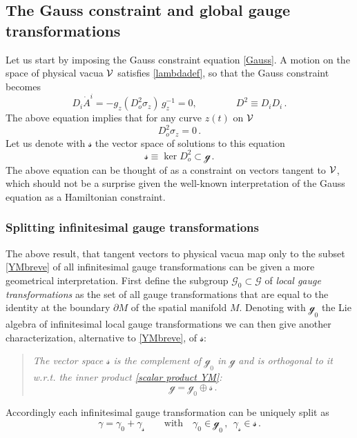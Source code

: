 \documentclass[11pt,a4paper]{article}
\def\calg{{\mathscr G}}
\def\calsg{{\boldsymbol{\mathscr g}}}
\def\calss{{\boldsymbol{\mathscr s}}}
\def\calv{{\cal V}}
\begin{document}
    \subsection{The Gauss constraint and global gauge transformations}\label{gaussglobal}
    
    Let us start by imposing the Gauss constraint equation \eqref{Gauss}. A motion on the space of physical vacua $\calv$ satisfies \eqref{lambdadef}, so that the Gauss constraint becomes 
    \begin{equation}
    D_i\dot{A}^i=-g_z (D^2_o\sigma_z)\,g_z^{-1}=0,\qquad\qquad D^2\equiv D_{i}D_{i}\label{D2}\,.
    \end{equation}
    The above equation implies that for any curve $z(t)$ on $\calv$ 
    \begin{equation}
    D^2_o\sigma_z=0 \label{YMGauss}\,.
    \end{equation}
    Let us denote with $\calss$ the vector space of solutions to this equation
    \begin{equation}
    \calss\equiv\ker D^2_o\subset\calsg\label{YMbreve}\,.
    \end{equation}
    The above equation can be thought of as a constraint on vectors tangent to $\calv$, which should not be a surprise given the well-known interpretation of the Gauss equation as a Hamiltonian constraint.

    \subsubsection{Splitting infinitesimal gauge transformations}\label{secgauss}
    The above result, that tangent vectors to physical vacua map only to the subset \eqref{YMbreve} of all infinitesimal gauge transformations can be given a more geometrical interpretation. First define the subgroup $\calg_0\subset \calg$ of \textit{local gauge transformations} as the set of all gauge transformations that are equal to the identity at the boundary $\partial M$ of the spatial manifold $M$. Denoting with $\calsg_0$ the Lie algebra of infinitesimal local gauge transformations we can then give another characterization, alternative to \eqref{YMbreve}, of $\calss$: 
    \begin{quote}
    {\it The vector space $\calss$ is the complement of $\calsg_0$ in $\calsg$ and is orthogonal to it w.r.t.\! the inner product \eqref{scalar product YM}:
    	\begin{equation}
    	\calsg=\calsg_0\oplus\calss\label{decomp}\,.
    	\end{equation}}
    \end{quote}
    Accordingly each infinitesimal gauge transformation can be uniquely split as
    \begin{equation}
    \gamma=\gamma_0+\gamma_\calss\qquad\mbox{with}\quad \gamma_0\in\calsg_0\,,\ \ \gamma_\calss\in\calss\,.
    \end{equation}
    
\end{document}
